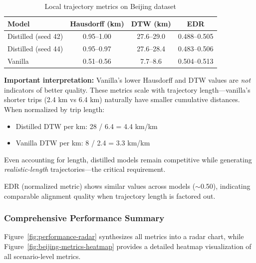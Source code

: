 \begin{table}[h]
    \centering
    \caption{Local trajectory metrics on Beijing dataset}
    \label{tab:local-results}
    \small
    \begin{tabular}{lccc}
        \toprule
        \textbf{Model}      & \textbf{Hausdorff (km)} & \textbf{DTW (km)} & \textbf{EDR} \\
        \midrule
        Distilled (seed 42) & 0.95--1.00              & 27.6--29.0        & 0.488--0.505 \\
        Distilled (seed 44) & 0.95--0.97              & 27.6--28.4        & 0.483--0.506 \\
        Vanilla             & 0.51--0.56              & 7.7--8.6          & 0.504--0.513 \\
        \bottomrule
    \end{tabular}
\end{table}

\textbf{Important interpretation:} Vanilla's lower Hausdorff and DTW values are \emph{not} indicators of better quality. These metrics scale with trajectory length—vanilla's shorter trips (2.4 km vs 6.4 km) naturally have smaller cumulative distances. When normalized by trip length:

\begin{itemize}[noitemsep,topsep=0pt]
    \item Distilled DTW per km: 28 / 6.4 = 4.4 km/km
    \item Vanilla DTW per km: 8 / 2.4 = 3.3 km/km
\end{itemize}

Even accounting for length, distilled models remain competitive while generating \emph{realistic-length} trajectories—the critical requirement.

EDR (normalized metric) shows similar values across models ($\sim$0.50), indicating comparable alignment quality when trajectory length is factored out.

\subsubsection{Comprehensive Performance Summary}

Figure~\ref{fig:performance-radar} synthesizes all metrics into a radar chart, while Figure~\ref{fig:beijing-metrics-heatmap} provides a detailed heatmap visualization of all scenario-level metrics.

